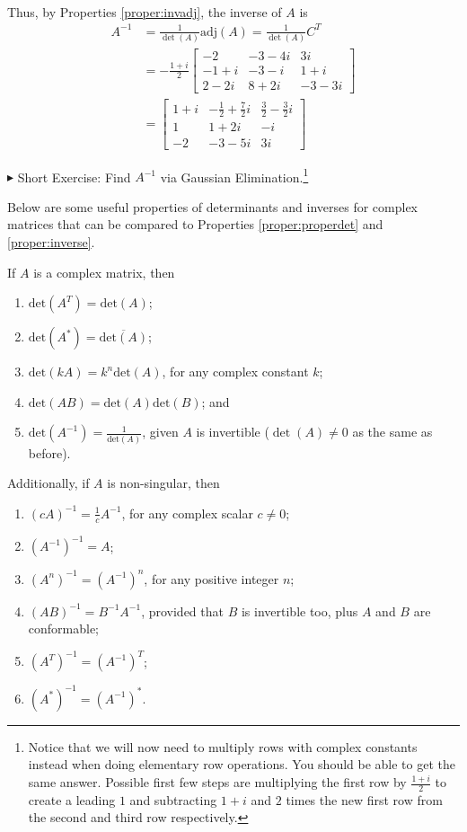 \begin{solution}
\begin{align*}
\end{align*}
Thus, by Properties \ref{proper:invadj}, the inverse of $A$ is
\begin{align*}
A^{-1} &= \frac{1}{\det(A)} \text{adj}(A) = \frac{1}{\det(A)} C^T \\
&= -\frac{1+i}{2} 
\begin{bmatrix}
-2 & -3-4i & 3i \\
-1+i & -3-i & 1+i \\
2-2i & 8+2i & -3-3i
\end{bmatrix} \\
&= 
\begin{bmatrix}
1+i & -\frac{1}{2}+\frac{7}{2}i & \frac{3}{2}-\frac{3}{2}i \\
1 & 1+2i & -i \\
-2 & -3-5i & 3i
\end{bmatrix} 
\end{align*}
\end{solution}

$\blacktriangleright$ Short Exercise: Find $A^{-1}$ via Gaussian Elimination.\footnote{Notice that we will now need to multiply rows with complex constants instead when doing elementary row operations. You should be able to get the same answer. Possible first few steps are multiplying the first row by $\frac{1+i}{2}$ to create a leading $1$ and subtracting $1+i$ and $2$ times the new first row from the second and third row respectively.}

Below are some useful properties of determinants and inverses for complex matrices that can be compared to Properties \ref{proper:properdet} and \ref{proper:inverse}.
\begin{proper}
If $A$ is a complex matrix, then
\begin{enumerate}
\item $\text{det}(A^T) = \text{det}(A)$;
\item $\text{det}(A^*) = \overline{\text{det}(A)}$;
\item $\text{det}(kA) = k^n \text{det}(A)$, for any complex constant $k$;
\item $\text{det}(AB) = \text{det}(A)\text{det}(B)$; and
\item $\text{det}(A^{-1}) = \frac{1}{\text{det}(A)}$, given $A$ is invertible ($\det(A) \neq 0$ as the same as before).
\end{enumerate}
Additionally, if $A$ is non-singular, then
\begin{enumerate}
\item $(cA)^{-1} = \frac{1}{c}A^{-1}$, for any complex scalar $c \neq 0$;
\item $(A^{-1})^{-1} = A$;
\item $(A^n)^{-1} = (A^{-1})^n$, for any positive integer $n$;
\item $(AB)^{-1} = B^{-1}A^{-1}$, provided that $B$ is invertible too, plus $A$ and $B$ are conformable;
\item $(A^T)^{-1} = (A^{-1})^T$;
\item $(A^*)^{-1} = (A^{-1})^*$.
\end{enumerate}
\end{proper}

